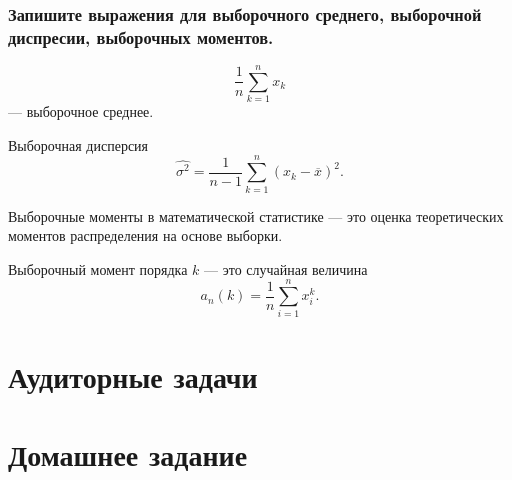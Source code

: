 \subsubsection*{Запишите выражения для выборочного среднего, выборочной диспресии,
                выборочных моментов.}

$$ \frac{1}{n} \sum \limits_{k = 1}^n x_k$$
--- выборочное среднее.

Выборочная дисперсия
$$ \hat{ \sigma^2} =
  \frac{1}{n - 1} \sum \limits_{k = 1}^n \left( x_k - \overline{x} \right)^2.$$

Выборочные моменты в математической статистике ---
это оценка теоретических моментов распределения на основе выборки.

Выборочный момент порядка $k$ --- это случайная величина
$$a_n \left( k \right) =
   \frac{1}{n} \sum \limits_{i = 1}^n x_i^k.$$

\section*{Аудиторные задачи}

\section*{Домашнее задание}
